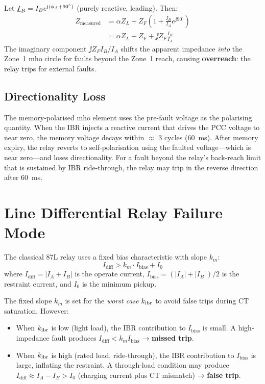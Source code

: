 Let $\underline{I}_B = I_B e^{\mathrm{j}(\phi_A + 90^\circ)}$ (purely reactive, leading).
Then:
\begin{align}
  Z_\mathrm{measured} &= \alpha Z_L + Z_F\left(1 + \frac{I_B}{I_A}e^{\jj 90^\circ}\right)
  \nonumber \\
  &= \alpha Z_L + Z_F + \jj Z_F \frac{I_B}{I_A}
  \label{eq:ch3_reactive_overreach}
\end{align}
The imaginary component $\jj Z_F I_B/I_A$ shifts the apparent impedance
\emph{into} the Zone~1 mho circle for faults beyond the Zone~1 reach,
causing \textbf{overreach}: the relay trips for external faults.

\subsection{Directionality Loss}

The memory-polarised mho element uses the pre-fault voltage as the
polarising quantity. When the IBR injects a reactive current that drives
the PCC voltage to near zero, the memory voltage decays within $\approx$
3 cycles (60~ms). After memory expiry, the relay reverts to self-polarisation
using the faulted voltage—which is near zero—and loses directionality.
For a fault beyond the relay's back-reach limit that is sustained by IBR
ride-through, the relay may trip in the reverse direction after 60~ms.

\section{Line Differential Relay Failure Mode}
\label{sec:ch3_87l}

The classical 87L relay uses a fixed bias characteristic with slope $k_m$:
\begin{equation}
  I_\mathrm{diff} > k_m \cdot I_\mathrm{bias} + I_0
  \label{eq:ch3_87l_fixed}
\end{equation}
where $I_\mathrm{diff} = |I_A + I_B|$ is the operate current,
$I_\mathrm{bias} = (|I_A| + |I_B|)/2$ is the restraint current, and
$I_0$ is the minimum pickup.

The fixed slope $k_m$ is set for the \emph{worst case} $k_{\mathrm{ibr}}$ to avoid
false trips during CT saturation. However:

\begin{itemize}
\item When $k_{\mathrm{ibr}}$ is low (light load), the IBR contribution to $I_\mathrm{bias}$
      is small. A high-impedance fault produces $I_\mathrm{diff} < k_m I_\mathrm{bias}$
      → \textbf{missed trip}.

\item When $k_{\mathrm{ibr}}$ is high (rated load, ride-through), the IBR contribution
      to $I_\mathrm{bias}$ is large, inflating the restraint. A through-load
      condition may produce $I_\mathrm{diff} \approx I_A - I_B > I_0$
      (charging current plus CT mismatch) → \textbf{false trip}.
\end{itemize}

